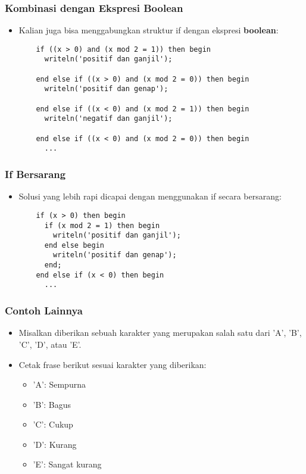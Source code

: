 \begin{frame}[fragile]
\frametitle{Kombinasi dengan Ekspresi Boolean}
\begin{itemize}
  \item Kalian juga bisa menggabungkan struktur if dengan ekspresi \textbf{boolean}:
  \begin{lstlisting}
    if ((x > 0) and (x mod 2 = 1)) then begin
      writeln('positif dan ganjil');

    end else if ((x > 0) and (x mod 2 = 0)) then begin
      writeln('positif dan genap');

    end else if ((x < 0) and (x mod 2 = 1)) then begin
      writeln('negatif dan ganjil');

    end else if ((x < 0) and (x mod 2 = 0)) then begin
      ...
  \end{lstlisting}
\end{itemize}
\end{frame}

\begin{frame}[fragile]
\frametitle{If Bersarang}
\begin{itemize}
  \item Solusi yang lebih rapi dicapai dengan menggunakan if secara bersarang:
  \begin{lstlisting}
    if (x > 0) then begin
      if (x mod 2 = 1) then begin
        writeln('positif dan ganjil');
      end else begin
        writeln('positif dan genap');
      end;
    end else if (x < 0) then begin
      ...
  \end{lstlisting}
\end{itemize}
\end{frame}

\begin{frame}
\frametitle{Contoh Lainnya}
\begin{itemize}
  \item Misalkan diberikan sebuah karakter yang merupakan salah satu dari 'A', 'B', 'C', 'D', atau 'E'.
  \item Cetak frase berikut sesuai karakter yang diberikan:
  \begin{itemize}
    \item 'A': Sempurna
    \item 'B': Bagus
    \item 'C': Cukup
    \item 'D': Kurang
    \item 'E': Sangat kurang
  \end{itemize}
\end{itemize}
\end{frame}

